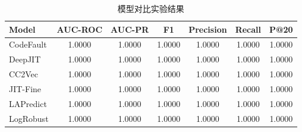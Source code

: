 

\begin{table}[t]
\centering
\caption{模型对比实验结果}
\label{tab:results}
\begin{tabular}{lcccccc}
\toprule
Model & AUC-ROC & AUC-PR & F1 & Precision & Recall & P@20 \\
\midrule
CodeFault & 1.0000 & 1.0000 & 1.0000 & 1.0000 & 1.0000 & 1.0000 \\
DeepJIT & 1.0000 & 1.0000 & 1.0000 & 1.0000 & 1.0000 & 1.0000 \\
CC2Vec & 1.0000 & 1.0000 & 1.0000 & 1.0000 & 1.0000 & 1.0000 \\
JIT-Fine & 1.0000 & 1.0000 & 1.0000 & 1.0000 & 1.0000 & 1.0000 \\
LAPredict & 1.0000 & 1.0000 & 1.0000 & 1.0000 & 1.0000 & 1.0000 \\
LogRobust & 1.0000 & 1.0000 & 1.0000 & 1.0000 & 1.0000 & 1.0000 \\
\bottomrule
\end{tabular}
\end{table}
